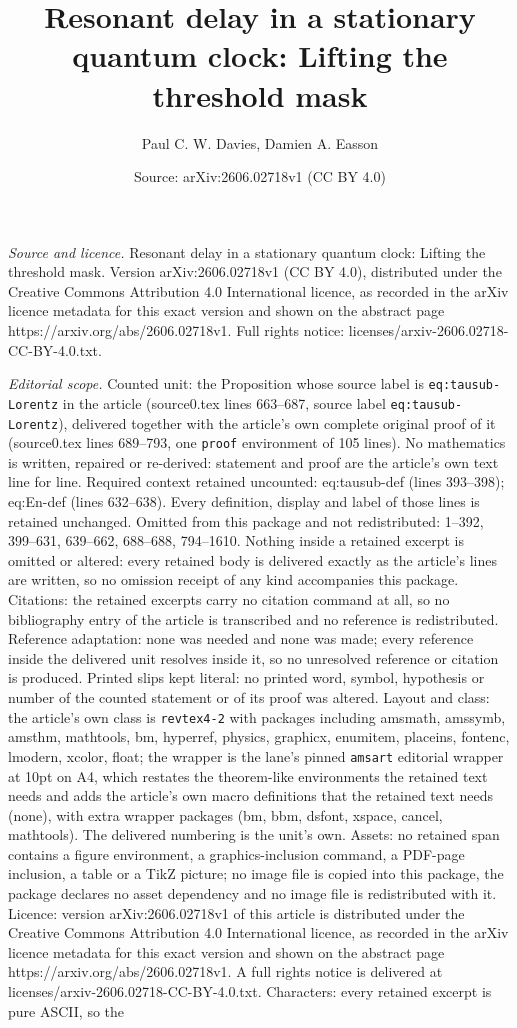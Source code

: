 \documentclass[10pt,a4paper]{amsart}
\title[Resonant delay in a stationary quantum clock: Lifting the th]{Resonant delay in a stationary quantum clock: Lifting the threshold mask}
\author{Paul C. W. Davies, Damien A. Easson}
\date{Source: arXiv:2606.02718v1 (CC BY 4.0)}
\begin{document}
\maketitle

\noindent\emph{Source and licence.} Resonant delay in a stationary quantum clock: Lifting the threshold mask. Version arXiv:2606.02718v1 (CC BY 4.0), distributed under the Creative Commons Attribution 4.0 International licence, as recorded in the arXiv licence metadata for this exact version and shown on the abstract page https://arxiv.org/abs/2606.02718v1. Full rights notice: licenses/arxiv-2606.02718-CC-BY-4.0.txt.\par\smallskip

\noindent\textit{Editorial scope.} Counted unit: the Proposition whose source label is \texttt{eq:tausub-Lorentz} in the article (source0.tex lines 663--687, source label \texttt{eq:tausub-Lorentz}), delivered together with the article's own complete original proof of it (source0.tex lines 689--793, one \texttt{proof} environment of 105 lines). No mathematics is written, repaired or re-derived: statement and proof are the article's own text line for line. Required context retained uncounted: eq:tausub-def (lines 393--398); eq:En-def (lines 632--638). Every definition, display and label of those lines is retained unchanged. Omitted from this package and not redistributed: 1--392, 399--631, 639--662, 688--688, 794--1610. Nothing inside a retained excerpt is omitted or altered: every retained body is delivered exactly as the article's lines are written, so no omission receipt of any kind accompanies this package. Citations: the retained excerpts carry no citation command at all, so no bibliography entry of the article is transcribed and no reference is redistributed. Reference adaptation: none was needed and none was made; every reference inside the delivered unit resolves inside it, so no unresolved reference or citation is produced. Printed slips kept literal: no printed word, symbol, hypothesis or number of the counted statement or of its proof was altered. Layout and class: the article's own class is \texttt{revtex4-2} with packages including amsmath, amssymb, amsthm, mathtools, bm, hyperref, physics, graphicx, enumitem, placeins, fontenc, lmodern, xcolor, float; the wrapper is the lane's pinned \texttt{amsart} editorial wrapper at 10pt on A4, which restates the theorem-like environments the retained text needs and adds the article's own macro definitions that the retained text needs (none), with extra wrapper packages (bm, bbm, dsfont, xspace, cancel, mathtools). The delivered numbering is the unit's own. Assets: no retained span contains a figure environment, a graphics-inclusion command, a PDF-page inclusion, a table or a TikZ picture; no image file is copied into this package, the package declares no asset dependency and no image file is redistributed with it. Licence: version arXiv:2606.02718v1 of this article is distributed under the Creative Commons Attribution 4.0 International licence, as recorded in the arXiv licence metadata for this exact version and shown on the abstract page https://arxiv.org/abs/2606.02718v1. A full rights notice is delivered at licenses/arxiv-2606.02718-CC-BY-4.0.txt. Characters: every retained excerpt is pure ASCII, so the 
\end{document}
